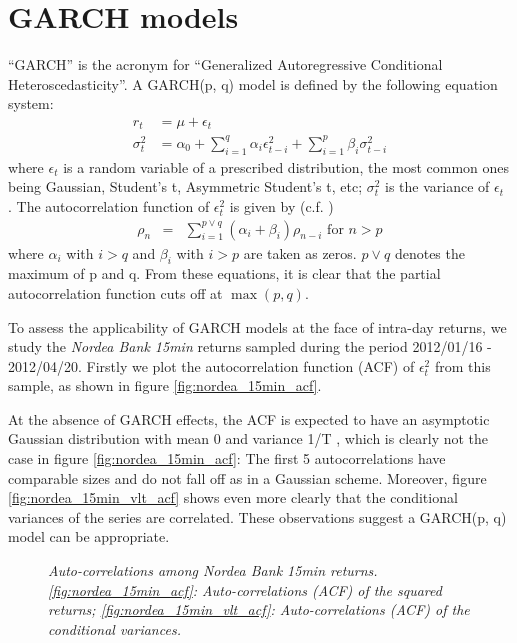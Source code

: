 \section{GARCH models} \label{sec:Garch_model}
``GARCH'' is the acronym for ``Generalized Autoregressive Conditional
Heteroscedasticity''. A GARCH(p, q) model is defined by the following
equation system:
\begin{equation}
  \label{eq:garch_def}
  \begin{aligned}
    r_t &= \mu + \epsilon_t \\
    \sigma_t^2 &= \alpha_0 + \sum_{i=1}^q \alpha_i \epsilon_{t-i}^2 +
    \sum_{i=1}^p \beta_i \sigma_{t-i}^2
  \end{aligned}
\end{equation}
where $\epsilon_t$ is a random variable of a prescribed distribution,
the most common ones being Gaussian, Student's t, Asymmetric Student's
t, etc; $\sigma_t^2$ is the variance of $\epsilon_t$
\cite{Bollerslev86}. The autocorrelation function of $\epsilon_t^2$ is
given by (c.f. \cite{Bollerslev87})
\begin{eqnarray*}
\rho_n &=& \sum_{i=1} ^{p \vee q} (\alpha_i + \beta_i) \rho_{n-i}
\text{ for $n > p$}
\end{eqnarray*}
where $\alpha_i$ with $i > q$ and $\beta_i$ with $i > p$ are taken as
zeros. $p \vee q$ denotes the maximum of p and q. From these
equations, it is clear that the partial autocorrelation function cuts
off at $\max(p, q)$.

To assess the applicability of GARCH models at the face of intra-day
returns, we study the {\it Nordea Bank 15min} returns sampled during
the period 2012/01/16 - 2012/04/20. Firstly we plot the autocorrelation
function (ACF) of $\epsilon_t^2$ from this sample, as shown
in figure \ref{fig:nordea_15min_acf}.

At the absence of GARCH effects, the ACF is expected to have an
asymptotic Gaussian distribution with mean 0 and variance 1/T
\cite{Bollerslev86, Bollerslev87}, which is clearly not the case in
figure \ref{fig:nordea_15min_acf}: The first 5 autocorrelations have
comparable sizes and do not fall off as in a Gaussian
scheme. Moreover, figure \ref{fig:nordea_15min_vlt_acf} shows 
even more clearly that the conditional variances of the series are
correlated. These observations suggest a GARCH(p, q) model can be
appropriate.

\begin{figure}[htb!]
  \centering
  \caption{\small \it Auto-correlations among Nordea Bank 15min
    returns. \ref{fig:nordea_15min_acf}: Auto-correlations (ACF) of the
    squared returns; \ref{fig:nordea_15min_vlt_acf}: Auto-correlations
    (ACF) of the conditional variances.}
\end{figure}

